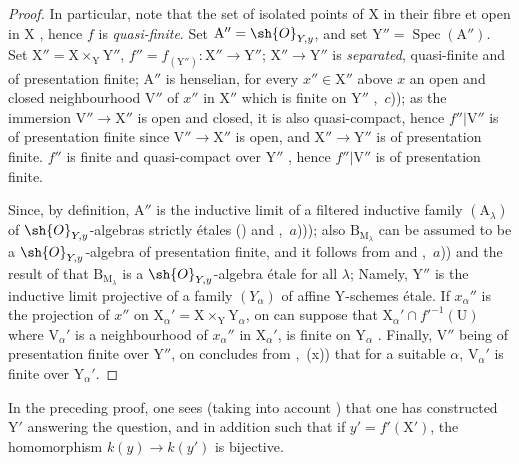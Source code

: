 \begin{proof}
In particular, note that the set of isolated points of $\mathrm{X}$ in their fibre et open in $\mathrm{X}$ , hence $f$ is \emph{quasi-finite}.
Set $\mathrm{A}''=\sh{O}_{Y,y}$, and set $\mathrm{Y}''=\operatorname{Spec}(\mathrm{A}'')$.
Set $\mathrm{X}''=\mathrm{X}\times_{\mathrm{Y}}\mathrm{Y}''$, $f''=f_{(\mathrm{Y}'')}:\mathrm{X}''\to\mathrm{Y}''$; $\mathrm{X}''\to\mathrm{Y}''$ is \emph{separated}, quasi-finite and of presentation finite; $\mathrm{A}''$ is henselian, for every $x''\in\mathrm{X}''$ above $x$ an open and closed neighbourhood $\mathrm{V}''$ of $x''$ in $\mathrm{X}''$ which is finite on $\mathrm{Y}''$ ,~$c$)); as the immersion $\mathrm{V}''\to\mathrm{X}''$ is open and closed, it is also quasi-compact, hence $f''|\mathrm{V}''$ is of presentation finite since $\mathrm{V}''\to\mathrm{X}''$ is open, and $\mathrm{X}''\to\mathrm{Y}''$ is of presentation finite.
$f''$ is finite and quasi-compact over $\mathrm{Y}''$ , hence $f''|\mathrm{V}''$ is of presentation finite.

Since, by definition, $\mathrm{A}''$ is the inductive limit of a filtered inductive family $(\mathrm{A}_\lambda)$ of $\sh{O}_{Y,y}$-algebras strictly \'etales () and ,~$a$))); also $\mathrm{B}_{\mathrm{M}_\lambda}$ can be assumed to be a $\sh{O}_{Y,y}$-algebra of presentation finite, and it follows from  and ,~$a$)) and the result of  that $\mathrm{B}_{\mathrm{M}_\lambda}$ is a $\sh{O}_{Y,y}$-algebra \'etale for all $\lambda$; Namely, $\mathrm{Y}''$ is the inductive limit projective of a family $(Y_\alpha)$ of affine $\mathrm{Y}$-schemes \'etale.
If $x_\alpha''$ is the projection of $x''$ on $\mathrm{X}_\alpha'=\mathrm{X}\times_{\mathrm{Y}}\mathrm{Y}_\alpha$, on can suppose that $\mathrm{X}_\alpha'\cap f'^{-1}(\mathrm{U})$ where $\mathrm{V}_\alpha'$ is a neighbourhood of $x_\alpha''$ in $\mathrm{X}_\alpha'$, is finite on $\mathrm{Y}_\alpha$ .
Finally, $\mathrm{V}''$ being of presentation finite over $\mathrm{Y}''$, on concludes from ,~(x)) that for a suitable $\alpha$, $\mathrm{V}_\alpha'$ is finite over $\mathrm{Y}_\alpha'$.
\end{proof}

\begin{remark}[18.12.2]
\label{IV.18.12.2}
In the preceding proof, one sees (taking into account ) that one has constructed $\mathrm{Y}'$ answering the question, and in addition such that if $y'=f'(\mathrm{X}')$, the homomorphism $k(y)\to k(y')$ is bijective.
\end{remark}

